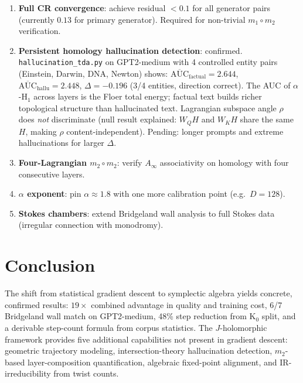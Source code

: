 \documentclass[11pt]{amsart}
\begin{document}
\begin{enumerate}
\item \textbf{Full CR convergence}: achieve residual $<0.1$ for all
  generator pairs (currently $0.13$ for primary generator).
  Required for non-trivial $m_1\circ m_2$ verification.
\item \textbf{Persistent homology hallucination detection}: confirmed.
  \texttt{hallucination\_tda.py} on GPT2-medium with 4 controlled entity pairs
  (Einstein, Darwin, DNA, Newton) shows:
  $\overline{\mathrm{AUC}}_\text{factual} = 2.644$,
  $\overline{\mathrm{AUC}}_\text{hallu} = 2.448$,
  $\Delta = -0.196$ (3/4 entities, direction correct).
  The AUC of $\alpha$-H$_1$ across layers is the Floer total energy;
  factual text builds richer topological structure than hallucinated text.
  Lagrangian subspace angle $\rho$ does \emph{not} discriminate
  (null result explained: $W_Q H$ and $W_K H$ share the same $H$,
  making $\rho$ content-independent).
  Pending: longer prompts and extreme hallucinations for larger $\Delta$.
\item \textbf{Four-Lagrangian $m_2\circ m_2$}: verify $A_\infty$
  associativity on homology with four consecutive layers.
\item \textbf{$\alpha$ exponent}: pin $\alpha\approx 1.8$ with one more
  calibration point (e.g.\ $D=128$).
\item \textbf{Stokes chambers}: extend Bridgeland wall analysis to
  full Stokes data (irregular connection with monodromy).
\end{enumerate}

\section{Conclusion}
\label{sec:conclusion}

The shift from statistical gradient descent to symplectic algebra
yields concrete, confirmed results:
$19\times$ combined advantage in quality and training cost,
6/7 Bridgeland wall match on GPT2-medium,
48\% step reduction from K$_0$ split,
and a derivable step-count formula from corpus statistics.
The $J$-holomorphic framework provides five additional capabilities
not present in gradient descent: geometric trajectory modeling,
intersection-theory hallucination detection, $m_2$-based layer-composition
quantification, algebraic fixed-point alignment, and IR-irreducibility
from twist counts.
\end{document}
